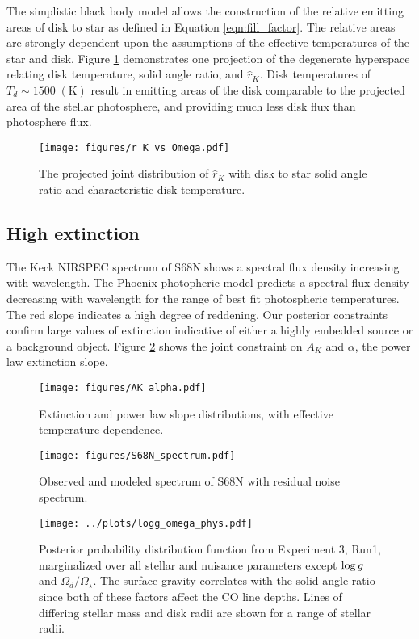 \documentclass[twocolumn]{emulateapj}%
\begin{document}
The simplistic black body model allows the construction of the relative emitting areas of disk to star as defined in Equation \ref{eqn:fill_factor}.  The relative areas are strongly dependent upon the assumptions of the effective temperatures of the star and disk.  Figure \ref{fig:omega_rat} demonstrates one projection of the degenerate hyperspace relating disk temperature, solid angle ratio, and $\hat r_K$.  Disk temperatures of $T_d \sim 1500\;(\mathrm{K})$ result in emitting areas of the disk comparable to the projected area of the stellar photosphere, and providing much less disk flux than photosphere flux.  

\begin{figure}
 \centering
 \texttt{[image: figures/r\_K\_vs\_Omega.pdf]}
 \caption{The projected joint distribution of $\hat r_K$ with disk to star solid angle ratio and characteristic disk temperature.}
 \label{fig:omega_rat}
\end{figure}


\subsection{High extinction}
The Keck NIRSPEC spectrum of S68N shows a spectral flux density increasing with wavelength.  The Phoenix photopheric model predicts a spectral flux density decreasing with wavelength for the range of best fit photospheric temperatures.  The red slope indicates a high degree of reddening.  Our posterior constraints confirm large values of extinction indicative of either a highly embedded source or a background object.  Figure \ref{fig:A_K_plot} shows the joint constraint on $A_K$ and $\alpha$, the power law extinction slope.  

\begin{figure}
 \centering
 \texttt{[image: figures/AK\_alpha.pdf]}
 \caption{Extinction and power law slope distributions, with effective temperature dependence.}
 \label{fig:A_K_plot}
\end{figure}


\begin{figure}
 \centering
 \texttt{[image: figures/S68N\_spectrum.pdf]}
 \caption{Observed and modeled spectrum of S68N with residual noise spectrum.}
 \label{fig:S68N_spectrum}
\end{figure}



\begin{figure}
 \centering
 \texttt{[image: ../plots/logg\_omega\_phys.pdf]}
 \caption{Posterior probability distribution function from Experiment 3, Run1, marginalized over all stellar and nuisance parameters except $\log g$ and $\Omega_d/\Omega_\star$.  The surface gravity correlates with the solid angle ratio since both of these factors affect the CO line depths.  Lines of differing stellar mass and disk radii are shown for a range of stellar radii.}
 \label{fig:posterior_loggOmega}
\end{figure}
\end{document}
